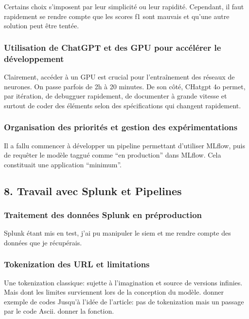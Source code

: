 \documentclass[
  letterpaper,
  DIV=11,
  numbers=noendperiod]{scrartcl}
\begin{document}
Certains choix s'imposent par leur simplicité ou leur rapidité.
Cependant, il faut rapidement se rendre compte que les scores f1 sont
mauvais et qu'une autre solution peut être tentée.

\subsubsection{Utilisation de ChatGPT et des GPU pour accélérer le
développement}\label{utilisation-de-chatgpt-et-des-gpu-pour-accuxe9luxe9rer-le-duxe9veloppement}

Clairement, accéder à un GPU est crucial pour l'entraînement des réseaux
de neurones. On passe parfois de 2h à 20 minutes. De son côté, CHatgpt
4o permet, par itération, de debugguer rapidement, de documenter à
grande vitesse et surtout de coder des éléments selon des spécifications
qui changent rapidement.

\subsubsection{Organisation des priorités et gestion des
expérimentations}\label{organisation-des-priorituxe9s-et-gestion-des-expuxe9rimentations}

Il a fallu commencer à développer un pipeline permettant d'utiliser
MLflow, puis de requêter le modèle taggué comme ``en production'' dans
MLflow. Cela constituait une application ``minimum''.

\subsection{8. Travail avec Splunk et
Pipelines}\label{travail-avec-splunk-et-pipelines}

\subsubsection{Traitement des données Splunk en
préproduction}\label{traitement-des-donnuxe9es-splunk-en-pruxe9production}

Splunk étant mis en test, j'ai pu manipuler le siem et me rendre compte
des données que je récupérais.

\subsubsection{Tokenization des URL et
limitations}\label{tokenization-des-url-et-limitations}

Une tokenization classique: sujette à l'imagination et source de
versions infinies. Mais dont les limites surviennent lors de la
conception du modèle. donner exemple de codes Jusqu'à l'idée de
l'article: pas de tokenization mais un passage par le code Ascii. donner
la fonction.
\end{document}

